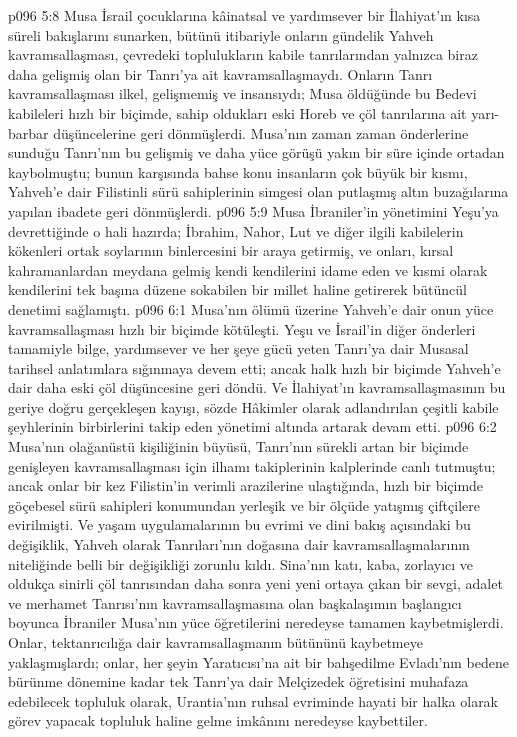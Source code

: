 \vs p096 5:8 Musa İsrail çocuklarına kâinatsal ve yardımsever bir İlahiyat’ın kısa süreli bakışlarını sunarken, bütünü itibariyle onların gündelik Yahveh kavramsallaşması, çevredeki toplulukların kabile tanrılarından yalnızca biraz daha gelişmiş olan bir Tanrı’ya ait kavramsallaşmaydı. Onların Tanrı kavramsallaşması ilkel, gelişmemiş ve insansıydı; Musa öldüğünde bu Bedevi kabileleri hızlı bir biçimde, sahip oldukları eski Horeb ve çöl tanrılarına ait yarı\hyp{}barbar düşüncelerine geri dönmüşlerdi. Musa’nın zaman zaman önderlerine sunduğu Tanrı’nın bu gelişmiş ve daha yüce görüşü yakın bir süre içinde ortadan kaybolmuştu; bunun karşısında bahse konu insanların çok büyük bir kısmı, Yahveh’e dair Filistinli sürü sahiplerinin simgesi olan putlaşmış altın buzağılarına yapılan ibadete geri dönmüşlerdi.
\vs p096 5:9 Musa İbraniler’in yönetimini Yeşu’ya devrettiğinde o hali hazırda; İbrahim, Nahor, Lut ve diğer ilgili kabilelerin kökenleri ortak soylarının binlercesini bir araya getirmiş, ve onları, kırsal kahramanlardan meydana gelmiş kendi kendilerini idame eden ve kısmi olarak kendilerini tek başına düzene sokabilen bir millet haline getirerek bütüncül denetimi sağlamıştı.
\vs p096 6:1 Musa’nın ölümü üzerine Yahveh’e dair onun yüce kavramsallaşması hızlı bir biçimde kötüleşti. Yeşu ve İsrail’in diğer önderleri tamamiyle bilge, yardımsever ve her şeye gücü yeten Tanrı’ya dair Musasal tarihsel anlatımlara sığınmaya devem etti; ancak halk hızlı bir biçimde Yahveh’e dair daha eski çöl düşüncesine geri döndü. Ve İlahiyat’ın kavramsallaşmasının bu geriye doğru gerçekleşen kayışı, sözde Hâkimler olarak adlandırılan çeşitli kabile şeyhlerinin birbirlerini takip eden yönetimi altında artarak devam etti.
\vs p096 6:2 Musa’nın olağanüstü kişiliğinin büyüsü, Tanrı’nın sürekli artan bir biçimde genişleyen kavramsallaşması için ilhamı takiplerinin kalplerinde canlı tutmuştu; ancak onlar bir kez Filistin’in verimli arazilerine ulaştığında, hızlı bir biçimde göçebesel sürü sahipleri konumundan yerleşik ve bir ölçüde yatışmış çiftçilere evirilmişti. Ve yaşam uygulamalarının bu evrimi ve dini bakış açısındaki bu değişiklik, Yahveh olarak Tanrıları’nın doğasına dair kavramsallaşmalarının niteliğinde belli bir değişikliği zorunlu kıldı. Sina’nın katı, kaba, zorlayıcı ve oldukça sinirli çöl tanrısından daha sonra yeni yeni ortaya çıkan bir sevgi, adalet ve merhamet Tanrısı’nın kavramsallaşmasına olan başkalaşımın başlangıcı boyunca İbraniler Musa’nın yüce öğretilerini neredeyse tamamen kaybetmişlerdi. Onlar, tektanrıcılığa dair kavramsallaşmanın bütününü kaybetmeye yaklaşmışlardı; onlar, her şeyin Yaratıcısı’na ait bir bahşedilme Evladı’nın bedene bürünme dönemine kadar tek Tanrı’ya dair Melçizedek öğretisini muhafaza edebilecek topluluk olarak, Urantia’nın ruhsal evriminde hayati bir halka olarak görev yapacak topluluk haline gelme imkânını neredeyse kaybettiler.
